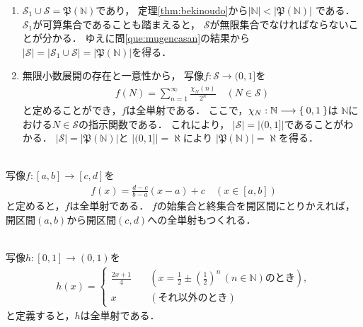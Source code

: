 \begin{description}
\begin{enumerate}
\item $\mathscr{S}_1 \cup \mathscr{S} = \mathfrak{P}
  ( \mathbb{N} )$であり，
  定理\ref{thm:bekinoudo}から$\lvert \mathbb{N} \rvert < 
  \lvert \mathfrak{P} ( \mathbb{N} ) \rvert$
  である．
  $\mathscr{S}_1$が可算集合であることも踏まえると，
  $\mathscr{S}$が無限集合でなければならないことが分かる．
  ゆえに問\ref{que:mugencasan}の結果から
  $\lvert \mathscr{S} \rvert = \lvert \mathscr{S}_1 
  \cup \mathscr{S} \rvert = \lvert \mathfrak{P}
  ( \mathbb{N} ) \rvert$を得る．

\item 無限小数展開の存在と一意性から，
  写像$f: \mathscr{S} \longrightarrow (0,1]$を
  \begin{align*}
    f(N) = \sum_{n=1}^{\infty} \frac{\chi_N ( n) }{2^n} \quad ( N \in \mathscr{S} )
  \end{align*}
  と定めることができ，$f$は全単射である．
  ここで，$\chi_N : \mathbb{N} \longrightarrow \Set{0,1}$は
  $\mathbb{N}$における$N \in \mathscr{S}$の指示関数である．
  これにより，
  $\lvert \mathscr{S} \rvert = \left \lvert (0,1] \right \rvert $であることがわかる．
  $\lvert \mathscr{S} \rvert = \lvert \mathfrak{P}(\mathbb{N} ) \rvert$と
  $\left \lvert (0,1] \right \rvert = \aleph$により
  $\lvert \mathfrak{P}(\mathbb{N})\rvert = \aleph$を得る．
  \end{enumerate}

\item[\refque{que:heiheikaikai}] \mbox{} \\
  写像$f: [a,b] \longrightarrow [c,d] $を
  \begin{align*}
    f(x) = \frac{d-c}{b-a} ( x-a) +c \quad ( x \in [a,b] )
  \end{align*}
  と定めると，$f$は全単射である．
  $f$の始集合と終集合を開区間にとりかえれば，
  開区間$(a,b)$から開区間$(c,d)$への全単射もつくれる．

\item[\refque{que:heikaizen}] \mbox{} \\
  写像$h: [0,1] \longrightarrow (0,1) $を
  \begin{align*}
    h(x) = \left \{
      \begin{aligned}
        \frac{2x+1}{4} \quad & \left ( x = \frac{1}{2} \pm 
        \left ( \frac{1}{2} \right) ^n \, ( n \in \mathbb{N} ) \text{のとき} \right) , \\
        x \qquad & ( \text{それ以外のとき} )
      \end{aligned}
      \right.
  \end{align*}
  と定義すると，$h$は全単射である．


\end{description}
